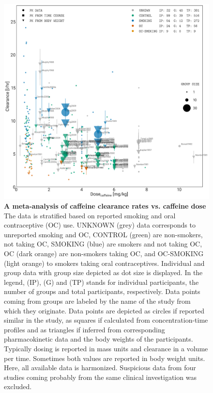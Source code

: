 \documentclass[a4,center,fleqn]{NAR}
\begin{document}
\begin{figure}[t]
\begin{center}
\includegraphics{NAR-fig4.png}
\end{center}
\caption{\textbf{A meta-analysis of caffeine clearance rates vs. caffeine dose} \newline
 The data is stratified based on reported smoking and oral contraceptive (OC) use. UNKNOWN (grey) data corresponds to unreported smoking and OC, CONTROL (green) are non-smokers, not taking OC, SMOKING (blue) are smokers and not taking OC, OC (dark orange) are non-smokers taking OC, and OC-SMOKING (light orange) to smokers taking oral contraceptives. Individual and group data with group size depicted as dot size is displayed. In the legend, (IP), (G) and (TP) stands for individual participants, the number of groups and total participants, respectively. Data points coming from groups are labeled by the name of the study from which they originate. Data points are depicted as circles if reported similar in the study, as squares if calculated from concentration-time profiles and as triangles if inferred from corresponding pharmacokinetic data and the body weights of the participants. Typically dosing is reported in mass units and clearance in a volume per time. Sometimes both values are reported in body weight units. Here, all available data is harmonized. Suspicious data from four studies \cite{Stille1987, Harder1988, Harder1989, Balogh1992} coming probably from the same clinical investigation was excluded.
}
\label{NAR-fig4}
\end{figure}
\end{document}
